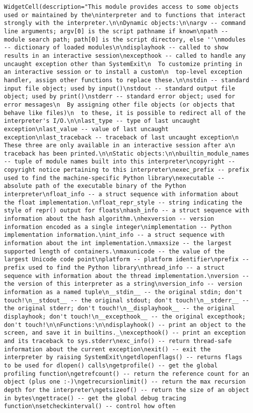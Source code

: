 \documentclass[11pt]{article}
\begin{document}
\begin{verbatim}
WidgetCell(description="This module provides access to some objects used or maintained by the\ninterpreter and to functions that interact strongly with the interpreter.\n\nDynamic objects:\n\nargv -- command line arguments; argv[0] is the script pathname if known\npath -- module search path; path[0] is the script directory, else ''\nmodules -- dictionary of loaded modules\n\ndisplayhook -- called to show results in an interactive session\nexcepthook -- called to handle any uncaught exception other than SystemExit\n  To customize printing in an interactive session or to install a custom\n  top-level exception handler, assign other functions to replace these.\n\nstdin -- standard input file object; used by input()\nstdout -- standard output file object; used by print()\nstderr -- standard error object; used for error messages\n  By assigning other file objects (or objects that behave like files)\n  to these, it is possible to redirect all of the interpreter's I/O.\n\nlast_type -- type of last uncaught exception\nlast_value -- value of last uncaught exception\nlast_traceback -- traceback of last uncaught exception\n  These three are only available in an interactive session after a\n  traceback has been printed.\n\nStatic objects:\n\nbuiltin_module_names -- tuple of module names built into this interpreter\ncopyright -- copyright notice pertaining to this interpreter\nexec_prefix -- prefix used to find the machine-specific Python library\nexecutable -- absolute path of the executable binary of the Python interpreter\nfloat_info -- a struct sequence with information about the float implementation.\nfloat_repr_style -- string indicating the style of repr() output for floats\nhash_info -- a struct sequence with information about the hash algorithm.\nhexversion -- version information encoded as a single integer\nimplementation -- Python implementation information.\nint_info -- a struct sequence with information about the int implementation.\nmaxsize -- the largest supported length of containers.\nmaxunicode -- the value of the largest Unicode code point\nplatform -- platform identifier\nprefix -- prefix used to find the Python library\nthread_info -- a struct sequence with information about the thread implementation.\nversion -- the version of this interpreter as a string\nversion_info -- version information as a named tuple\n__stdin__ -- the original stdin; don't touch!\n__stdout__ -- the original stdout; don't touch!\n__stderr__ -- the original stderr; don't touch!\n__displayhook__ -- the original displayhook; don't touch!\n__excepthook__ -- the original excepthook; don't touch!\n\nFunctions:\n\ndisplayhook() -- print an object to the screen, and save it in builtins._\nexcepthook() -- print an exception and its traceback to sys.stderr\nexc_info() -- return thread-safe information about the current exception\nexit() -- exit the interpreter by raising SystemExit\ngetdlopenflags() -- returns flags to be used for dlopen() calls\ngetprofile() -- get the global profiling function\ngetrefcount() -- return the reference count for an object (plus one :-)\ngetrecursionlimit() -- return the max recursion depth for the interpreter\ngetsizeof() -- return the size of an object in bytes\ngettrace() -- get the global debug tracing function\nsetcheckinterval() -- control how often 
\end{verbatim}
\end{document}
